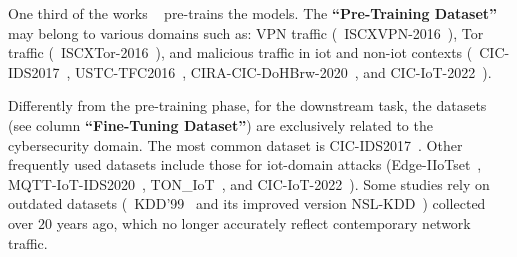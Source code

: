 One third of the works%
~\cite{lin2022, ullah2023tnn, meng2023netgpt, guthula2023netfound, wang2024lens, wang2024netmamba, wang2024lightweight} pre-trains the models.
The \textbf{``Pre-Training Dataset''} may belong to various domains 
such as: VPN traffic (\ie~ISCXVPN-2016~\cite{lin2022, meng2023netgpt, wang2024lens, wang2024netmamba}), Tor traffic (\ie~ISCXTor-2016~\cite{wang2024lens, wang2024netmamba}), and malicious traffic in \gls{iot} and non-\gls{iot} contexts (\ie~CIC-IDS2017~\cite{wang2024lightweight, lin2022}, USTC-TFC2016~\cite{meng2023netgpt, wang2024lens, wang2024netmamba}, 
%    
CIRA-CIC-DoHBrw-2020~\cite{wang2024lens}, 
%
and CIC-IoT-2022~\cite{wang2024lens, wang2024netmamba}).

Differently from the pre-training phase, for the downstream task, the datasets (see column \textbf{``Fine-Tuning Dataset''}) are exclusively related to the cybersecurity domain.
The most common dataset is CIC-IDS2017~\cite{li2022extreme, ho2022network, wu2022, wang2023robust, manocchio2024flowtransformer, guthula2023netfound, wang2024lightweight}.
Other frequently used datasets include those for \gls{iot}-domain attacks (\eg Edge-IIoTset~\cite{ghourabi2022security, ferrag2024, melicias2024gpt}, MQTT-IoT-IDS2020~\cite{ullah2023tnn, manocchio2024flowtransformer}, TON\_IoT~\cite{ghourabi2022security, manocchio2024flowtransformer, wang2024lightweight}, and CIC-IoT-2022~\cite{wang2024netmamba}). 
Some studies rely on outdated datasets (\ie~KDD'99~\cite{ali2023, wang2023robust} and its improved version NSL-KDD~\cite{manocchio2024flowtransformer, lai2023}) collected over $20$ years ago, which no longer accurately reflect contemporary network traffic.



















    



